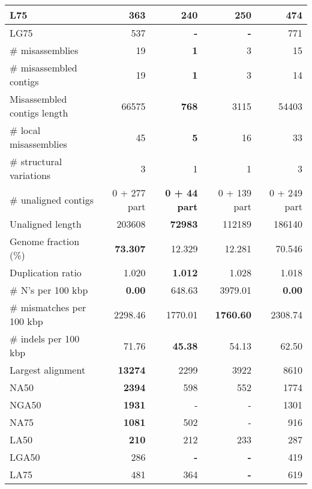 \documentclass[12pt,a4paper]{article}
\begin{document}
\begin{table}[ht]
\begin{center}
\begin{tabular}{|l*{4}{|r}|}
L75 & 363 & {\bf 240} & 250 & 474 \\ \hline
LG75 & 537 & {\bf -} & {\bf -} & 771 \\ \hline
\# misassemblies & 19 & {\bf 1} & 3 & 15 \\ \hline
\# misassembled contigs & 19 & {\bf 1} & 3 & 14 \\ \hline
Misassembled contigs length & 66575 & {\bf 768} & 3115 & 54403 \\ \hline
\# local misassemblies & 45 & {\bf 5} & 16 & 33 \\ \hline
\# structural variations & 3 & 1 & 1 & 3 \\ \hline
\# unaligned contigs & 0 + 277 part & {\bf 0 + 44 part} & 0 + 139 part & 0 + 249 part \\ \hline
Unaligned length & 203608 & {\bf 72983} & 112189 & 186140 \\ \hline
Genome fraction (\%) & {\bf 73.307} & 12.329 & 12.281 & 70.546 \\ \hline
Duplication ratio & 1.020 & {\bf 1.012} & 1.028 & 1.018 \\ \hline
\# N's per 100 kbp & {\bf 0.00} & 648.63 & 3979.01 & {\bf 0.00} \\ \hline
\# mismatches per 100 kbp & 2298.46 & 1770.01 & {\bf 1760.60} & 2308.74 \\ \hline
\# indels per 100 kbp & 71.76 & {\bf 45.38} & 54.13 & 62.50 \\ \hline
Largest alignment & {\bf 13274} & 2299 & 3922 & 8610 \\ \hline
NA50 & {\bf 2394} & 598 & 552 & 1774 \\ \hline
NGA50 & {\bf 1931} & - & - & 1301 \\ \hline
NA75 & {\bf 1081} & 502 & - & 916 \\ \hline
LA50 & {\bf 210} & 212 & 233 & 287 \\ \hline
LGA50 & 286 & {\bf -} & {\bf -} & 419 \\ \hline
LA75 & 481 & 364 & {\bf -} & 619 \\ \hline
\end{tabular}
\end{center}
\end{table}
\end{document}
